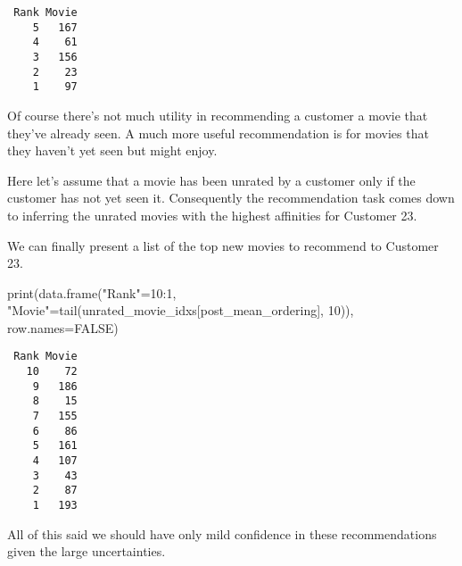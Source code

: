 \documentclass[
  letterpaper,
  DIV=11,
  numbers=noendperiod]{scrartcl}
\newenvironment{Shaded}{\begin{snugshade}}{\end{snugshade}}
\newcommand{\AttributeTok}[1]{\textcolor[rgb]{0.40,0.45,0.13}{#1}}
\newcommand{\ConstantTok}[1]{\textcolor[rgb]{0.56,0.35,0.01}{#1}}
\newcommand{\ControlFlowTok}[1]{\textcolor[rgb]{0.00,0.23,0.31}{#1}}
\newcommand{\DecValTok}[1]{\textcolor[rgb]{0.68,0.00,0.00}{#1}}
\newcommand{\FunctionTok}[1]{\textcolor[rgb]{0.28,0.35,0.67}{#1}}
\newcommand{\NormalTok}[1]{\textcolor[rgb]{0.00,0.23,0.31}{#1}}
\newcommand{\OtherTok}[1]{\textcolor[rgb]{0.00,0.23,0.31}{#1}}
\newcommand{\SpecialCharTok}[1]{\textcolor[rgb]{0.37,0.37,0.37}{#1}}
\newcommand{\StringTok}[1]{\textcolor[rgb]{0.13,0.47,0.30}{#1}}
\begin{document}
\begin{verbatim}
 Rank Movie
    5   167
    4    61
    3   156
    2    23
    1    97
\end{verbatim}

Of course there's not much utility in recommending a customer a movie
that they've already seen. A much more useful recommendation is for
movies that they haven't yet seen but might enjoy.

Here let's assume that a movie has been unrated by a customer only if
the customer has not yet seen it. Consequently the recommendation task
comes down to inferring the unrated movies with the highest affinities
for Customer 23.

\begin{Shaded}
\end{Shaded}

We can finally present a list of the top new movies to recommend to
Customer 23.

\begin{Shaded}
\begin{Highlighting}[]
\FunctionTok{print}\NormalTok{(}\FunctionTok{data.frame}\NormalTok{(}\StringTok{"Rank"}\OtherTok{=}\DecValTok{10}\SpecialCharTok{:}\DecValTok{1}\NormalTok{,}
                 \StringTok{"Movie"}\OtherTok{=}\FunctionTok{tail}\NormalTok{(unrated\_movie\_idxs[post\_mean\_ordering], }\DecValTok{10}\NormalTok{)),}
      \AttributeTok{row.names=}\ConstantTok{FALSE}\NormalTok{)}
\end{Highlighting}
\end{Shaded}

\begin{verbatim}
 Rank Movie
   10    72
    9   186
    8    15
    7   155
    6    86
    5   161
    4   107
    3    43
    2    87
    1   193
\end{verbatim}

All of this said we should have only mild confidence in these
recommendations given the large uncertainties.
\end{document}
